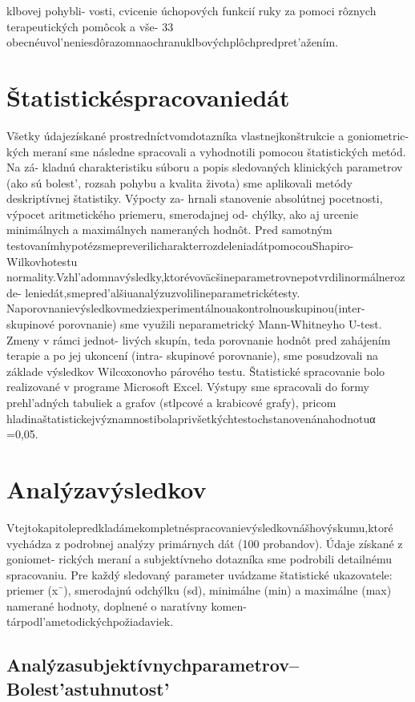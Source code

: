 klbovej pohybli- vosti, cvicenie úchopových funkcií ruky za pomoci rôznych terapeutických pomôcok a vše- 33 obecnéuvol’neniesdôrazomnaochranuklbovýchplôchpredpret’ažením.


\section{Štatistickéspracovaniedát}

Všetky údajezískané prostredníctvomdotazníka vlastnejkonštrukcie a goniometric- kých meraní sme následne spracovali a vyhodnotili pomocou štatistických metód. Na zá- kladnú charakteristiku súboru a popis sledovaných klinických parametrov (ako sú bolest’, rozsah pohybu a kvalita života) sme aplikovali metódy deskriptívnej štatistiky. Výpocty za- hrnali stanovenie absolútnej pocetnosti, výpocet aritmetického priemeru, smerodajnej od- chýlky, ako aj urcenie minimálnych a maximálnych nameraných hodnôt. Pred samotným testovanímhypotézsmepreverilicharakterrozdeleniadátpomocouShapiro-Wilkovhotestu normality.Vzhl’adomnavýsledky,ktorévoväcšineparametrovnepotvrdilinormálnerozde- leniedát,smepred’alšiuanalýzuzvolilineparametrickétesty. Naporovnanievýsledkovmedziexperimentálnouakontrolnouskupinou(inter-skupinové porovnanie) sme využili neparametrický Mann-Whitneyho U-test. Zmeny v rámci jednot- livých skupín, teda porovnanie hodnôt pred zahájením terapie a po jej ukoncení (intra- skupinové porovnanie), sme posudzovali na základe výsledkov Wilcoxonovho párového testu. Štatistické spracovanie bolo realizované v programe Microsoft Excel. Výstupy sme spracovali do formy prehl’adných tabuliek a grafov (stlpcové a krabicové grafy), pricom hladinaštatistickejvýznamnostibolaprivšetkýchtestochstanovenánahodnotuα =0,05.


\section{Analýzavýsledkov}

Vtejtokapitolepredkladámekompletnéspracovanievýsledkovnášhovýskumu,ktoré vychádza z podrobnej analýzy primárnych dát (100 probandov). Údaje získané z goniomet- rických meraní a subjektívneho dotazníka sme podrobili detailnému spracovaniu. Pre každý sledovaný parameter uvádzame štatistické ukazovatele: priemer (x¯), smerodajnú odchýlku (sd), minimálne (min) a maximálne (max) namerané hodnoty, doplnené o naratívny komen- tárpodl’ametodickýchpožiadaviek.


\subsection{Analýzasubjektívnychparametrov--Bolest’astuhnutost’}

